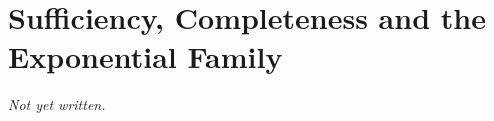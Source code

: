 \chapter{Sufficiency, Completeness and the Exponential Family}\label{ch:sufficiency-exponential-family}


\textit{Not yet written.}
